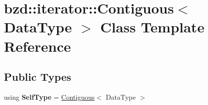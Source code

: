 \hypertarget{classbzd_1_1iterator_1_1Contiguous}{}\section{bzd\+:\+:iterator\+:\+:Contiguous$<$ Data\+Type $>$ Class Template Reference}
\label{classbzd_1_1iterator_1_1Contiguous}
\subsection*{Public Types}
\begin{DoxyCompactItemize}
\item 
\mbox{\label{classbzd_1_1iterator_1_1Contiguous_a84e974999f1a7541291af005d478575c}} 
using {\bfseries Self\+Type} = \hyperlink{classbzd_1_1iterator_1_1Contiguous}{Contiguous}$<$ Data\+Type $>$
\end{DoxyCompactItemize}
